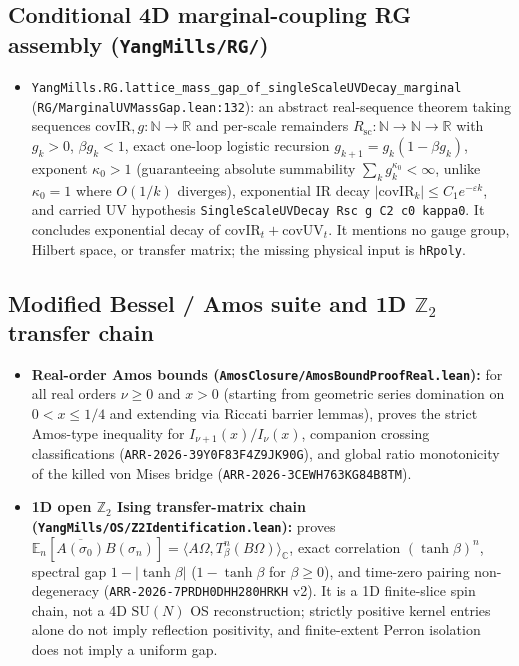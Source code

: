 \documentclass[11pt]{article}
\newcommand{\Z}{\mathbb{Z}}
\newcommand{\C}{\mathbb{C}}
\newcommand{\Om}{\Omega}
\newcommand{\Ex}{\mathbb{E}}
\begin{document}
\subsection{Conditional 4D marginal-coupling RG assembly (\texttt{YangMills/RG/})}
\begin{itemize}
  \item \nolinkurl{YangMills.RG.lattice_mass_gap_of_singleScaleUVDecay_marginal}
  (\nolinkurl{RG/MarginalUVMassGap.lean:132}): an abstract real-sequence theorem taking
  sequences $\mathrm{covIR}, g : \mathbb{N} \to \mathbb{R}$ and per-scale remainders
  $R_{\mathrm{sc}} : \mathbb{N} \to \mathbb{N} \to \mathbb{R}$ with $g_k > 0$,
  $\beta g_k < 1$, exact one-loop logistic recursion $g_{k+1} = g_k(1 - \beta g_k)$,
  exponent $\kappa_0 > 1$ (guaranteeing absolute summability $\sum_k g_k^{\kappa_0} < \infty$,
  unlike $\kappa_0 = 1$ where $O(1/k)$ diverges), exponential IR decay
  $|\mathrm{covIR}_k| \le C_1 e^{-\varepsilon k}$, and carried UV hypothesis
  \texttt{SingleScaleUVDecay Rsc g C2 c0 kappa0}. It concludes exponential decay of
  $\mathrm{covIR}_t + \mathrm{covUV}_t$. It mentions no gauge group, Hilbert space, or
  transfer matrix; the missing physical input is \texttt{hRpoly}.
\end{itemize}

\subsection{Modified Bessel / Amos suite and 1D $\Z_2$ transfer chain}
\begin{itemize}
  \item \textbf{Real-order Amos bounds (\texttt{AmosClosure/AmosBoundProofReal.lean}):}
  for all real orders $\nu \ge 0$ and $x > 0$ (starting from geometric series domination
  on $0 < x \le 1/4$ and extending via Riccati barrier lemmas), proves the strict Amos-type
  inequality for $I_{\nu+1}(x)/I_\nu(x)$, companion crossing classifications
  (\texttt{ARR-2026-39Y0F83F4Z9JK90G}), and global ratio monotonicity of the killed von
  Mises bridge (\texttt{ARR-2026-3CEWH763KG84B8TM}).
  \item \textbf{1D open $\Z_2$ Ising transfer-matrix chain (\texttt{YangMills/OS/Z2Identification.lean}):}
  proves $\Ex_n[\overline{A(\sigma_0)}B(\sigma_n)] = \langle A\Om, T_\beta^n(B\Om)\rangle_{\C}$,
  exact correlation $(\tanh\beta)^n$, spectral gap $1-|\tanh\beta|$ ($1-\tanh\beta$ for
  $\beta \ge 0$), and time-zero pairing non-degeneracy (\texttt{ARR-2026-7PRDH0DHH280HRKH} v2).
  It is a 1D finite-slice spin chain, not a 4D $\mathrm{SU}(N)$ OS reconstruction; strictly
  positive kernel entries alone do not imply reflection positivity, and finite-extent
  Perron isolation does not imply a uniform gap.
\end{itemize}
\end{document}

